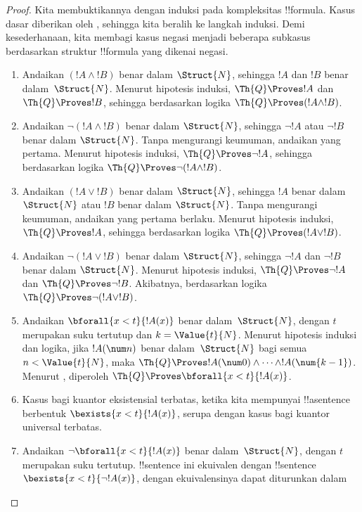 \documentclass[../../../include/open-logic-section]{subfiles}
\begin{document}
\begin{proof}
Kita membuktikannya dengan induksi pada kompleksitas !!{formula}.
%
Kasus dasar diberikan oleh , sehingga kita
beralih ke langkah induksi. Demi kesederhanaan, kita membagi kasus negasi
menjadi beberapa subkasus berdasarkan struktur !!{formula} yang dikenai
negasi.

\begin{enumerate}
\item Andaikan $(!A \land !B)$ benar dalam $\Struct{N}$, sehingga $!A$ dan
$!B$ benar dalam~$\Struct{N}$. Menurut hipotesis induksi,
$\Th{Q} \Proves !A$ dan $\Th{Q} \Proves !B$, sehingga berdasarkan logika
$\Th{Q} \Proves (!A \land !B)$.
%
\item Andaikan $\lnot (!A \land !B)$ benar dalam $\Struct{N}$, sehingga
$\lnot !A$ atau $\lnot !B$ benar dalam $\Struct{N}$. Tanpa mengurangi
keumuman, andaikan yang pertama. Menurut hipotesis induksi,
$\Th{Q} \Proves \lnot !A$, sehingga berdasarkan logika
$\Th{Q} \Proves \lnot (!A \land !B)$.
%
\item Andaikan $(!A \lor !B)$ benar dalam $\Struct{N}$, sehingga $!A$ benar
dalam $\Struct{N}$ atau $!B$ benar dalam $\Struct{N}$. Tanpa mengurangi
keumuman, andaikan yang pertama berlaku. Menurut hipotesis induksi,
$\Th{Q} \Proves !A$, sehingga berdasarkan logika
$\Th{Q} \Proves (!A \lor !B)$.
%
\item Andaikan $\lnot(!A \lor !B)$ benar dalam $\Struct{N}$, sehingga
$\lnot !A$ dan $\lnot !B$ benar dalam $\Struct{N}$. Menurut hipotesis
induksi, $\Th{Q} \Proves \lnot !A$ dan
$\Th{Q} \Proves \lnot !B$. Akibatnya, berdasarkan logika
$\Th{Q} \Proves \lnot(!A \lor !B)$.
%
\item Andaikan $\bforall{x<t}{!A(x)}$ benar dalam~$\Struct{N}$, dengan $t$
merupakan suku tertutup dan $k=\Value{t}{N}$. Menurut hipotesis induksi dan
logika, jika $!A(\num n)$ benar dalam~$\Struct{N}$ bagi semua
$n < \Value{t}{N}$, maka
$\Th{Q} \Proves !A(\num 0) \land \dots \land !A(\num{k-1})$. Menurut
, diperoleh
$\Th{Q} \Proves \bforall{x<t}{!A(x)}$.
%
\item Kasus bagi kuantor eksistensial terbatas, ketika kita mempunyai
!!a{sentence} berbentuk $\bexists{x < t}{!A(x)}$, serupa dengan kasus bagi
kuantor universal terbatas.
%
\item Andaikan $\lnot \bforall{x<t}{!A(x)}$ benar dalam~$\Struct{N}$, dengan
$t$ merupakan suku tertutup. !!{sentence} ini ekuivalen dengan !!{sentence}
$\bexists{x<t}{\lnot !A(x)}$, dengan ekuivalensinya dapat diturunkan dalam

\end{enumerate}
\end{proof}
\end{document}
